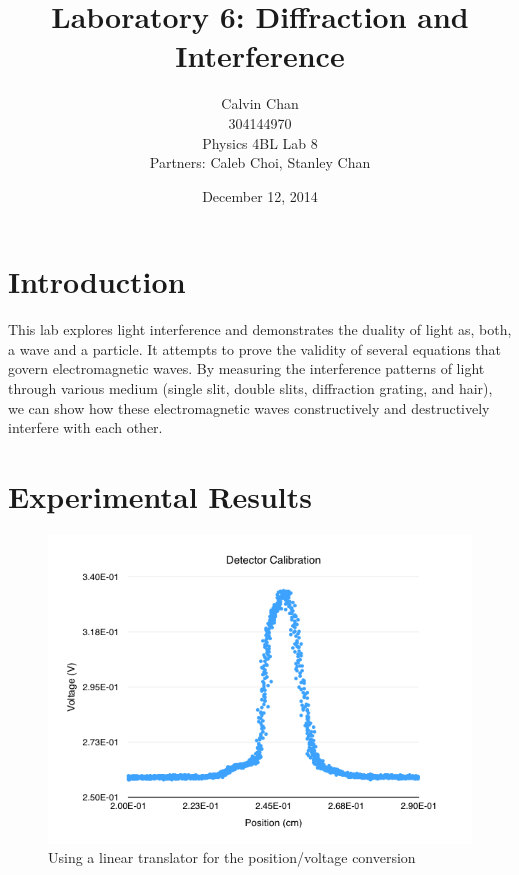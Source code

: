 \documentclass{article}
\begin{document}
\title{Laboratory 6: Diffraction and Interference}
\date{December 12, 2014}
\author{Calvin Chan\\304144970\\Physics 4BL Lab 8\\Partners: Caleb Choi, Stanley
Chan}

\maketitle

\section{Introduction}

This lab explores light interference and demonstrates the duality of light as,
both, a wave and a particle. It attempts to prove the validity of several
equations that govern electromagnetic waves. By measuring the interference
patterns of light through various medium (single slit, double slits, diffraction
grating, and hair), we can show how these electromagnetic waves constructively
and destructively interfere with each other.

\section{Experimental Results}

\begin{figure}[H]
    \centering
    \includegraphics[width=\textwidth]{charts/calibration}
    \caption{Using a linear translator for the position/voltage conversion}
    \label{calibration}
\end{figure}
\end{document}
